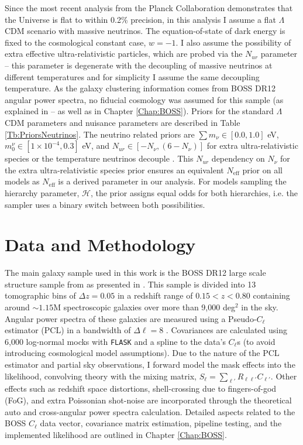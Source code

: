 Since the most recent analysis from the Planck Collaboration demonstrates that the Universe is flat to within 0.2\% precision, in this analysis I assume a flat $\Lambda$CDM scenario with massive neutrinos. The equation-of-state of dark energy is fixed to the cosmological constant case, $w=-1$. I also assume the possibility of extra effective ultra-relativistic particles, which are probed via the $N_{ur}$ parameter -- this parameter is degenerate with the decoupling of massive neutrinos at different temperatures and for simplicity I assume the same decoupling temperature. As the galaxy clustering information comes from BOSS DR12 angular power spectra, no fiducial cosmology was assumed for this sample (as explained in \cite{2018LoureiroBOSS} -- as well as in Chapter \ref{Chap:BOSS}). Priors for the standard $\Lambda$CDM parameters and nuisance parameters are described in Table \ref{Tb:PriorsNeutrinos}. The neutrino related priors are $\sum m_{\nu} \in [0.0, 1.0]$ eV, $m_{0}^{\nu} \in [1\times 10^{-4},0.3]$ eV, and $N_{ur} \in [-N_{\nu},(6-N_{\nu})]$ for extra ultra-relativistic species or the temperature neutrinos decouple \citep{2012Julien-Deg}. This $N_{ur}$ dependency on $N_{\nu}$ for the extra ultra-relativistic species prior ensures an equivalent $N_{\text{eff}}$ prior on all models as $N_{\text{eff}}$ is a derived parameter in our analysis. For models sampling the hierarchy parameter, $\mathcal{H}$, the prior assigns equal odds for both hierarchies, i.e. the sampler uses a binary switch between both possibilities.


\section{Data and Methodology}
The main galaxy sample used in this work is the BOSS DR12 large scale structure sample from \cite{BOSSCatalogue2016} as presented in \cite[][and in Chapter \ref{Chap:BOSS}]{2018LoureiroBOSS}. This sample is divided into 13 tomographic bins of $\Delta z = 0.05$ in a redshift range of $0.15 < z < 0.80$ containing around $\sim 1.15$M spectroscopic galaxies over more than 9,000 deg$^2$ in the sky. Angular power spectra of these galaxies are measured using a Pseudo-$C_{\ell}$ estimator (PCL) \citep[][ -- see Section \ref{Sec:Measurements}]{Thomas2011,Peebles1973,Efstat2004} in a bandwidth of $\Delta\ell =8$ \citep{2018LoureiroBOSS}. Covariances are calculated using 6,000 log-normal mocks with \texttt{FLASK} \citep{Flask2016} and a spline to the data's $C_{\ell}$s (to avoid introducing cosmological model assumptions). Due to the nature of the PCL estimator and partial sky observations, I forward model the mask effects into the likelihood, convolving theory with the mixing matrix, $S_{\ell} = \sum_{\ell'}R_{\ell \ell'} C_{\ell'}$. Other effects such as redshift space distortions, shell-crossing due to fingers-of-god (FoG), and extra Poissonian shot-noise are incorporated through the theoretical auto and cross-angular power spectra calculation. Detailed aspects related to the BOSS $C_{\ell}$ data vector, covariance matrix estimation, pipeline testing, and the implemented likelihood are outlined in Chapter \ref{Chap:BOSS}.

